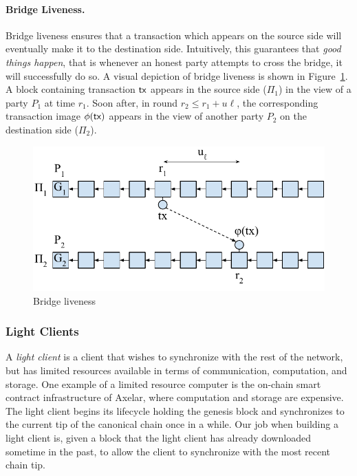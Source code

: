 \paragraph{Bridge Liveness.}
Bridge liveness ensures that a transaction which appears on the source side will eventually make
it to the destination side. Intuitively, this guarantees that \emph{good things happen}, that is whenever an
honest party attempts to cross the bridge, it will successfully do so.
A visual depiction of bridge liveness is shown in Figure~\ref{fig:bridge-liveness}.
A block containing transaction $\textsf{tx}$ appears in the source side ($\Pi_1$) in the view
of a party $P_1$ at time $r_1$. Soon after, in round $r_2 \leq r_1 + u\ell$, the corresponding transaction image
$\phi(\textsf{tx})$ appears in the view of another party $P_2$ on the destination side ($\Pi_2$).

\begin{figure}
    \center
    \includegraphics[width=0.7\columnwidth]{figures/bridge-liveness.pdf}
    \caption{Bridge liveness}
    \label{fig:bridge-liveness}
\end{figure}

\subsubsection{Light Clients}

A \emph{light client} is a client that wishes to synchronize with the rest
of the network, but has limited resources available in terms of communication,
computation, and storage. One example of a limited resource computer is the
on-chain smart contract infrastructure of Axelar, where computation and storage
are expensive. The light client begins its lifecycle holding the genesis block
and synchronizes to the current tip of the canonical chain once in a while.
Our job when building a light client is, given a block that the light client
has already downloaded sometime in the past, to allow the client to
synchronize with the most recent chain tip.

